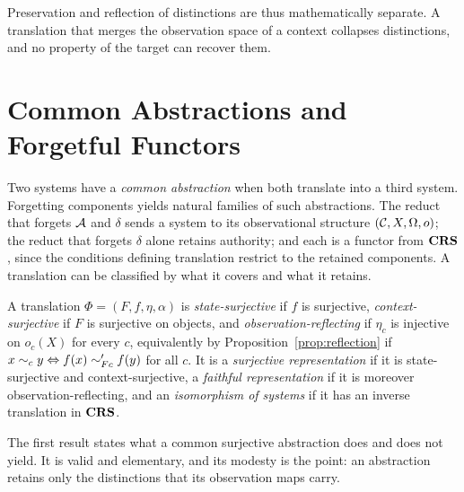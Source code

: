 Preservation and reflection of distinctions are thus mathematically separate. A translation that merges the observation space of a context collapses distinctions, and no property of the target can recover them.

\section{Common Abstractions and Forgetful Functors}

Two systems have a \emph{common abstraction} when both translate into a third system. Forgetting components yields natural families of such abstractions. The reduct that forgets $\mathcal A$ and $\delta$ sends a system to its observational structure $(\mathcal C,X,\Omega,o)$; the reduct that forgets $\delta$ alone retains authority; and each is a functor from $\mathbf{CRS}$, since the conditions defining translation restrict to the retained components. A translation can be classified by what it covers and what it retains.

\begin{definition}\label{def:kinds}
A translation $\Phi=(F,f,\eta,\alpha)$ is \emph{state-surjective} if $f$ is surjective, \emph{context-surjective} if $F$ is surjective on objects, and \emph{observation-reflecting} if $\eta_c$ is injective on $o_c(X)$ for every $c$, equivalently by Proposition~\ref{prop:reflection} if $x\sim_cy\Leftrightarrow f(x)\sim'_{Fc}f(y)$ for all $c$. It is a \emph{surjective representation} if it is state-surjective and context-surjective, a \emph{faithful representation} if it is moreover observation-reflecting, and an \emph{isomorphism of systems} if it has an inverse translation in $\mathbf{CRS}$.
\end{definition}

The first result states what a common surjective abstraction does and does not yield. It is valid and elementary, and its modesty is the point: an abstraction retains only the distinctions that its observation maps carry.

